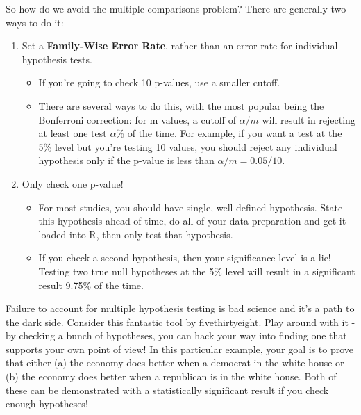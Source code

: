 \documentclass[
  letterpaper,
  DIV=11,
  numbers=noendperiod]{scrreprt}
\providecommand{\tightlist}{%
  \setlength{\itemsep}{0pt}\setlength{\parskip}{0pt}}\usepackage{longtable,booktabs,array}
\begin{document}
So how do we avoid the multiple comparisons problem? There are generally
two ways to do it:

\begin{enumerate}
\def\labelenumi{\arabic{enumi}.}
\tightlist
\item
  Set a \textbf{Family-Wise Error Rate}, rather than an error rate for
  individual hypothesis tests.

  \begin{itemize}
  \tightlist
  \item
    If you're going to check 10 p-values, use a smaller cutoff.
  \item
    There are several ways to do this, with the most popular being the
    Bonferroni correction: for m values, a cutoff of \(\alpha/m\) will
    result in rejecting at least one test \(\alpha\)\% of the time. For
    example, if you want a test at the 5\% level but you're testing 10
    values, you should reject any individual hypothesis only if the
    p-value is less than \(\alpha/m = 0.05/10\).
  \end{itemize}
\item
  Only check one p-value!

  \begin{itemize}
  \tightlist
  \item
    For most studies, you should have single, well-defined hypothesis.
    State this hypothesis ahead of time, do all of your data preparation
    and get it loaded into R, then only test that hypothesis.
  \item
    If you check a second hypothesis, then your significance level is a
    lie! Testing two true null hypotheses at the 5\% level will result
    in a significant result 9.75\% of the time.
  \end{itemize}
\end{enumerate}

Failure to account for multiple hypothesis testing is bad science and
it's a path to the dark side. Consider this fantastic tool by
\href{https://projects.fivethirtyeight.com/p-hacking/}{fivethirtyeight}.
Play around with it - by checking a bunch of hypotheses, you can hack
your way into finding one that supports your own point of view! In this
particular example, your goal is to prove that either (a) the economy
does better when a democrat in the white house or (b) the economy does
better when a republican is in the white house. Both of these can be
demonstrated with a statistically significant result if you check enough
hypotheses!
\end{document}
